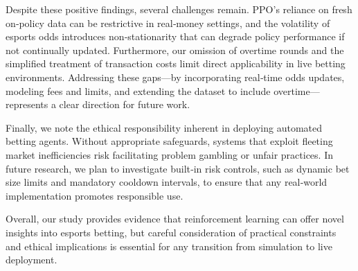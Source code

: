 \documentclass[sigconf]{acmart}
\begin{document}
Despite these positive findings, several challenges remain. PPO’s reliance on fresh on‐policy data can be restrictive in real‐money settings, and the volatility of esports odds introduces non‐stationarity that can degrade policy performance if not continually updated. Furthermore, our omission of overtime rounds and the simplified treatment of transaction costs limit direct applicability in live betting environments. Addressing these gaps—by incorporating real‐time odds updates, modeling fees and limits, and extending the dataset to include overtime—represents a clear direction for future work.

Finally, we note the ethical responsibility inherent in deploying automated betting agents. Without appropriate safeguards, systems that exploit fleeting market inefficiencies risk facilitating problem gambling or unfair practices. In future research, we plan to investigate built‐in risk controls, such as dynamic bet size limits and mandatory cooldown intervals, to ensure that any real‐world implementation promotes responsible use.

Overall, our study provides evidence that reinforcement learning can offer novel insights into esports betting, but careful consideration of practical constraints and ethical implications is essential for any transition from simulation to live deployment.




\end{document}
